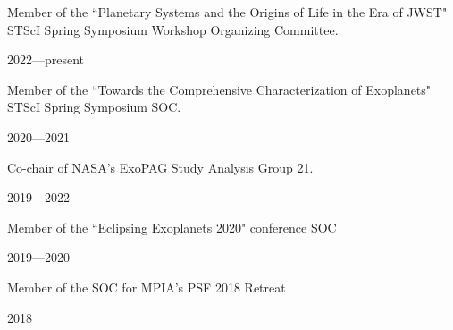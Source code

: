\documentclass[12pt, a4paper]{article} %
\begin{document}
\begin{minipage}[t]{0.7\textwidth}
\begin{flushleft}%
  \setlength{\leftskip}{0.2cm}%
Member of the ``Planetary Systems and the Origins of Life in the Era of JWST" STScI Spring Symposium Workshop Organizing Committee.
\end{flushleft}
\end{minipage}
\begin{minipage}[t]{0.3\textwidth}
\hfill 2022---present
\end{minipage}

\vspace{0.2cm}

\begin{minipage}[t]{0.7\textwidth}
\begin{flushleft}%
  \setlength{\leftskip}{0.2cm}%
Member of the ``Towards the Comprehensive Characterization of Exoplanets" STScI Spring Symposium SOC.
\end{flushleft}
\end{minipage}
\begin{minipage}[t]{0.3\textwidth}
\hfill 2020---2021
\end{minipage}

\vspace{0.2cm}

\begin{minipage}[t]{0.7\textwidth}
\begin{flushleft}%
  \setlength{\leftskip}{0.2cm}%
Co-chair of NASA's ExoPAG Study Analysis Group 21.
\end{flushleft}
\end{minipage}
\begin{minipage}[t]{0.3\textwidth}
\hfill 2019---2022
\end{minipage}

\vspace{0.2cm}

\begin{minipage}[t]{0.7\textwidth}
\begin{flushleft}%
  \setlength{\leftskip}{0.2cm}%
Member of the ``Eclipsing Exoplanets 2020" conference SOC
\end{flushleft}
\end{minipage}
\begin{minipage}[t]{0.3\textwidth}
\hfill 2019---2020
\end{minipage}

\vspace{0.2cm}

\begin{minipage}[t]{0.7\textwidth}
\begin{flushleft}%
  \setlength{\leftskip}{0.2cm}%
Member of the SOC for MPIA's PSF 2018 Retreat 
\end{flushleft}
\end{minipage}
\begin{minipage}[t]{0.3\textwidth}
\hfill 2018
\end{minipage}
\end{document}

